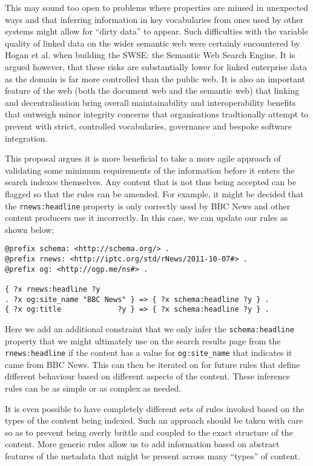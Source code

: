 This may sound too open to problems where properties are miused in
unexpected ways and that inferring information in key vocabularies from
ones used by other systems might allow for ``dirty data'' to appear. Such
difficulties with the variable quality of linked data on the wider semantic
web were certainly encountered by Hogan et al.\cite{hogan2011searching} when
building the SWSE: the Semantic Web Search Engine. It is argued however,
that these risks are substantially lower for linked enterprise data as
the domain is far more controlled than the public web. It is also an important
feature of the web (both the document web and the semantic web) that linking and
decentralisation bring overall maintainability and interoperability benefits
that outweigh minor integrity concerns that organisations tradtionally attempt
to prevent with strict, controlled vocabularies, governance and bespoke
software integration.

This proposal argues it is more beneficial to take a more agile approach
of validating some minimum requirements of the information before it
enters the search indexes themselves. Any content that is not thus
being accepted can be flagged so that the rules can be amended. For example,
it might be decided that the \texttt{rnews:headline} property is only
correctly used by BBC News and other content producers use it incorrectly. In
this case, we can update our rules as shown below:

\begin{centering}
\begin{lstlisting}[language=ttl]
@prefix schema: <http://schema.org/> .
@prefix rnews: <http://iptc.org/std/rNews/2011-10-07#> .
@prefix og: <http://ogp.me/ns#> .

{ ?x rnews:headline ?y
. ?x og:site_name "BBC News" } => { ?x schema:headline ?y } .
{ ?x og:title             ?y } => { ?x schema:headline ?y } .
\end{lstlisting}
\end{centering}

Here we add an additional constraint
that we only infer the \texttt{schema:headline} property that we might
ultimately use on the search results page from the \texttt{rnews:headline} if
the content has a value for \texttt{og:site\_name} that indicates it came
from BBC News. This can then be iterated on for future rules that define
different behaviour based on different aspects of the content. These inference
rules can be as simple or as complex as needed.

It is even possible to have
completely different sets of rules invoked based on the types of the content
being indexed. Such an approach should be taken with care so as to prevent
being overly brittle and coupled to the exact structure of the content. More
generic rules allow us to add information based on abstract features of the
metadata that might be present across many ``types'' of content.


